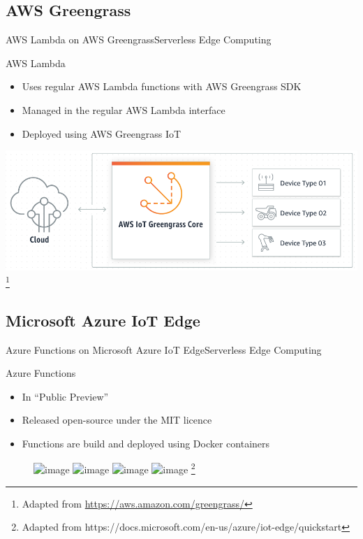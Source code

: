 \documentclass[10pt,xcolor={dvipsnames},notes]{beamer}
\renewcommand{\logofile}{example-grid-100x100pt}
\renewcommand{\logoscale}{0.0}
\begin{document}
\subsection{AWS Greengrass}
\renewcommand{\logofile}{img/aws_lambda}
\renewcommand{\logoscale}{0.55}
\begin{frame}{AWS Lambda on AWS Greengrass}{Serverless Edge Computing}

\begin{block}{AWS Lambda}
\begin{itemize}
    \item Uses regular AWS Lambda functions with AWS Greengrass SDK
    \item Managed in the regular AWS Lambda interface
    \item Deployed using AWS Greengrass IoT
\end{itemize}
\end{block}
\includegraphics[width=\textwidth]{img/aws_ggc_working}\footnote{Adapted from \href{https://aws.amazon.com/greengrass/}{https://aws.amazon.com/greengrass/}}
\end{frame}

\subsection{Microsoft Azure IoT Edge}
\renewcommand{\logofile}{img/azure_functions}
\renewcommand{\logoscale}{0.7}
\begin{frame}{Azure Functions on Microsoft Azure IoT Edge}{Serverless Edge Computing}

\begin{block}{Azure Functions}
\begin{itemize}
    \item In ``Public Preview''
    \item Released open-source under the MIT licence
    \item Functions are build and deployed using Docker containers
\end{itemize}
\end{block}
\begin{figure}
    \includegraphics<2>[width=.65\textwidth]{img/install-edge-1}
    \includegraphics<3>[width=.65\textwidth]{img/install-edge-2}
    \includegraphics<4>[width=.65\textwidth]{img/install-edge-3}
    \includegraphics<5>[width=.65\textwidth]{img/install-edge-4}
    \footnote<2-5>{Adapted from https://docs.microsoft.com/en-us/azure/iot-edge/quickstart}
\end{figure}
\end{frame}
\end{document}
